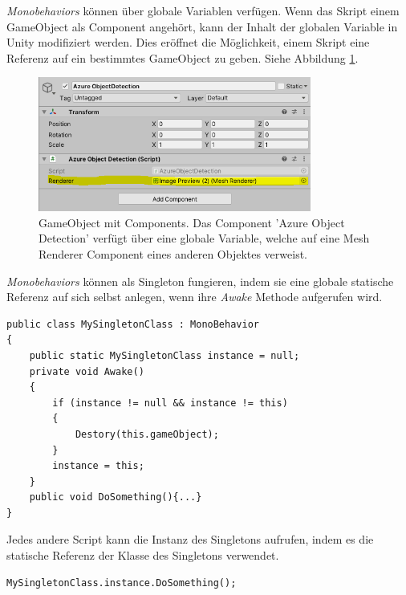 \textit{Monobehaviors} können über globale Variablen verfügen. Wenn das Skript einem GameObject als Component angehört, kann der Inhalt der globalen Variable in Unity modifiziert werden. Dies eröffnet die Möglichkeit, einem Skript eine Referenz auf ein bestimmtes GameObject zu geben. Siehe Abbildung \ref{img:gloabvars}.

\begin{figure}[H]
	\centering
	\includegraphics[width=0.8\textwidth]{images/img_globalVars.png}
	\caption[Unity GameObject mit Components]{GameObject mit Components. Das Component 'Azure Object Detection' verfügt über eine globale Variable, welche auf eine Mesh Renderer Component eines anderen Objektes verweist.}
	\label{img:gloabvars}
\end{figure}


\textit{Monobehaviors} können als Singleton fungieren, indem sie eine globale statische Referenz auf sich selbst anlegen, wenn ihre \textit{Awake} Methode aufgerufen wird.%

\begin{lstlisting}
public class MySingletonClass : MonoBehavior
{
	public static MySingletonClass instance = null;
	private void Awake()
	{
		if (instance != null && instance != this)
		{
			Destory(this.gameObject);
		}
		instance = this;
	}
	public void DoSomething(){...}
}
\end{lstlisting}


Jedes andere Script kann die Instanz des Singletons aufrufen, indem es die statische Referenz der Klasse des Singletons verwendet. %
\begin{lstlisting}
MySingletonClass.instance.DoSomething();
\end{lstlisting}

